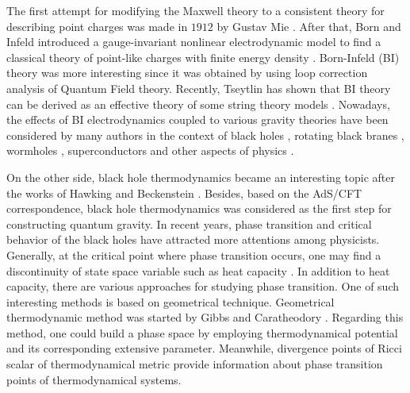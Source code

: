 \documentclass[aps,onecolumn ]{revtex4}
\begin{document}
The first attempt for modifying the Maxwell theory to a consistent
theory for describing point charges was made in $1912$ by Gustav
Mie \cite{Mie1,Mie2}. After that, Born and Infeld introduced a
gauge-invariant nonlinear electrodynamic model to find a classical
theory of point-like charges with finite energy density \cite{BI}.
Born-Infeld (BI) theory was more interesting since it was obtained
by using loop correction analysis of Quantum Field theory.
Recently, Tseytlin has shown that BI theory can be derived as an
effective theory of some string theory models
\cite{Low-energy1,Low-energy2,Low-energy3,Low-energy4,Low-energy5,Low-energy6}.
Nowadays, the effects of BI electrodynamics coupled to various
gravity theories have been considered by many authors in the
context of black holes
\cite{Blackhole1,Blackhole2,Blackhole3,Blackhole4,Blackhole5,Blackhole6,
Blackhole7,Blackhole8,Blackhole9,Blackhole10,Blackhole11,Blackhole12,
Blackhole13,Blackhole14,Blackhole15,Blackhole16,Blackhole17,Blackhole18,
Blackhole19,Blackhole20,Blackhole21,Blackhole22,Blackhole23,Blackhole24,Blackhole25},
rotating black branes
\cite{Rotating1,Rotating2,Rotating3,Rotating4,Rotating5,Rotating6,Rotating7},
wormholes \cite{Wormhole1,Wormhole2,Wormhole3,Wormhole4},
superconductors \cite{Super1,Super2,Super3,Super4,Super5,Super6}
and other aspects of physics \cite{BIpmi1,BIpmi2}.

On the other side, black hole thermodynamics became an interesting
topic after the works of Hawking and Beckenstein
\cite{HP1,HP2,HP3,HP4,HP5,HP6}. Besides, based on the AdS/CFT
correspondence, black hole thermodynamics was considered as the
first step for constructing quantum gravity. In recent years,
phase transition and critical behavior of the black holes have
attracted more attentions among physicists. Generally, at the
critical point where phase transition occurs, one may find a
discontinuity of state space variable such as heat capacity
\cite{HC}. In addition to heat capacity, there are various
approaches for studying phase transition. One of such interesting
methods is based on geometrical technique. Geometrical
thermodynamic method was started by Gibbs and Caratheodory
\cite{Callen}. Regarding this method, one could build a phase
space by employing thermodynamical potential and its corresponding
extensive parameter. Meanwhile, divergence points of Ricci scalar
of thermodynamical metric provide information about phase
transition points of thermodynamical systems.
\end{document}
